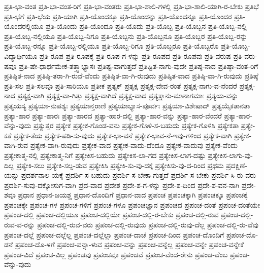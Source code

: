 {ಪ್ರತಿ-ಭಾ-ವಂತ
ಪ್ರತಿ-ಭಾ-ವಂತ-ರಿಗೆ
ಪ್ರತಿ-ಭಾ-ವಂತರು
ಪ್ರತಿ-ಭಾ-ಶಾಲಿ-ಗಳಲ್ಲಿ
ಪ್ರತಿ-ಭಾ-ಶಾಲಿ-ಯಾಗಿ-ರ-ಬೇಕು
ಪ್ರತಿಭೆ
ಪ್ರತಿ-ಭೆಗೆ
ಪ್ರತಿ-ಭೆಯ
ಪ್ರತಿ-ಯಾಗಿ
ಪ್ರತಿ-ಯೊಂದಕ್ಕೂ
ಪ್ರತಿ-ಯೊಂದನ್ನು
ಪ್ರತಿ-ಯೊಂದನ್ನೂ
ಪ್ರತಿ-ಯೊಂದರ
ಪ್ರತಿ-ಯೊಂದರಲ್ಲಿಯೂ
ಪ್ರತಿ-ಯೊಂದು
ಪ್ರತಿ-ಯೊಂದೂ
ಪ್ರತಿ-ಯೊದು
ಪ್ರತಿ-ಯೊಬ್ಬ
ಪ್ರತಿ-ಯೊಬ್ಬನ
ಪ್ರತಿ-ಯೊಬ್ಬ-ನಲ್ಲಿ
ಪ್ರತಿ-ಯೊಬ್ಬ-ನಲ್ಲಿಯೂ
ಪ್ರತಿ-ಯೊಬ್ಬ-ನಿಗೂ
ಪ್ರತಿ-ಯೊಬ್ಬನು
ಪ್ರತಿ-ಯೊಬ್ಬನೂ
ಪ್ರತಿ-ಯೊಬ್ಬರ
ಪ್ರತಿ-ಯೊಬ್ಬ-ರನ್ನು
ಪ್ರತಿ-ಯೊಬ್ಬ-ರನ್ನೂ
ಪ್ರತಿ-ಯೊಬ್ಬ-ರಲ್ಲಿಯೂ
ಪ್ರತಿ-ಯೊಬ್ಬ-ರಿಗೂ
ಪ್ರತಿ-ಯೊಬ್ಬರೂ
ಪ್ರತಿ-ಯೊಬ್ಬರೊ
ಪ್ರತಿ-ಯೊಬ್ಬ-ವಿದ್ಯಾರ್ಥಿಯೂ
ಪ್ರತಿ-ರೂಪ
ಪ್ರತಿ-ರೂಪಕ್ಕೆ
ಪ್ರತಿ-ರೂಪ-ಗ-ಳನ್ನು
ಪ್ರತಿ-ರೂಪದ
ಪ್ರತಿ-ರೂಪವು
ಪ್ರತಿ-ವರುಷ
ಪ್ರತಿ-ವರು-ಷವೂ
ಪ್ರತಿ-ಷೇ-ಧಾರ್ಥಮೇಕ-ತತ್ತ್ವಾಭ್ಯಾಸಃ
ಪ್ರತಿಷ್ಟ-ವಾಗುತ್ತದೆ
ಪ್ರತಿಷ್ಟಿತ-ನಾಗು-ವುದೇ
ಪ್ರತಿಷ್ಠ-ನಾದ
ಪ್ರತಿಷ್ಠಾ-ವಂತ-ರಿಗೆ
ಪ್ರತಿಷ್ಠಿತ-ನಾದ
ಪ್ರತಿಷ್ಠಿ-ತರಾ-ಗಿ-ರುವೆ-ವೆಂದು
ಪ್ರತಿಷ್ಠಿತ-ವಾ-ಗಿ-ರುವುದು
ಪ್ರತಿಷ್ಠಿತ-ವಾದ
ಪ್ರತಿಷ್ಠಿ-ವಾ-ಗಿ-ರುವುದು
ಪ್ರತಿಷ್ಠೆ
ಪ್ರತಿ-ಸಲ
ಪ್ರತಿ-ಸಲವೂ
ಪ್ರತಿ-ಸಾರಿಯೂ
ಪ್ರತೀಕ
ಪ್ರತ್ಯಕ್
ಪ್ರತ್ಯಕ್ಷ
ಪ್ರತ್ಯಕ್ಷ-ದೇವ-ರಂತೆ
ಪ್ರತ್ಯಕ್ಷ-ನಾಗು-ವ-ನೆಂದರೆ
ಪ್ರತ್ಯಕ್ಷ-ನಾದ
ಪ್ರತ್ಯಕ್ಷ-ವಾಗಿ
ಪ್ರತ್ಯಕ್ಷ-ವಾ-ಗಿತ್ತು
ಪ್ರತ್ಯಕ್ಷ-ವಾಗಿದೆ
ಪ್ರತ್ಯಕ್ಷ-ವಾದ
ಪ್ರತ್ಯಕ್ಷಾನು-ಮಾನಾಗಮಾಃ
ಪ್ರತ್ಯಯ-ವನ್ನು
ಪ್ರತ್ಯಯಸ್ಯ
ಪ್ರತ್ಯಯಾ-ನುಪಶ್ಯಃ
ಪ್ರತ್ಯಯಾನ್ತರಾಣಿ
ಪ್ರತ್ಯಯಾಭ್ಯಾಸ-ಪೂರ್ವಃ
ಪ್ರತ್ಯಯಾ-ವಿಶೇಷಾದ್
ಪ್ರತ್ಯಯೈಕತಾನತಾ
ಪ್ರತ್ಯಾ-ಹಾರ
ಪ್ರತ್ಯಾ-ಹಾರಃ
ಪ್ರತ್ಯಾ-ಹಾರದ
ಪ್ರತ್ಯಾ-ಹಾರ-ದಲ್ಲಿ
ಪ್ರತ್ಯಾ-ಹಾರ-ವನ್ನು
ಪ್ರತ್ಯಾ-ಹಾರ-ವೆಂದರೆ
ಪ್ರತ್ಯಾ-ಹಾರ-ವೆನ್ನು-ವುದು
ಪ್ರತ್ಯುತ್ತರ
ಪ್ರತ್ಯೇಕ
ಪ್ರತ್ಯೇಕ-ಗೊಂಡ-ವನು
ಪ್ರತ್ಯೇಕ-ಗೊಳಿ-ಸ-ಬಹುದು
ಪ್ರತ್ಯೇಕ-ಗೊಳಿಸಿ
ಪ್ರತ್ಯೇಕತಾ
ಪ್ರತ್ಯೇ-ಕತೆ
ಪ್ರತ್ಯೇಕ-ತೆಯ
ಪ್ರತ್ಯೇಕ-ಪಡಿ-ಸು-ವುದು
ಪ್ರತ್ಯೇಕ-ಭಾ-ವನೆ
ಪ್ರತ್ಯೇಕ-ಭಾವ-ನೆ-ಇವು-ಗಳಿಂದ
ಪ್ರತ್ಯೇಕ-ವಾಗಿ
ಪ್ರತ್ಯೇಕ-ವಾಗಿ-ರುವ
ಪ್ರತ್ಯೇಕ-ವಾಗಿ-ರುವುದು
ಪ್ರತ್ಯೇಕ-ವಾದ
ಪ್ರತ್ಯೇಕ-ವಾದು-ದೆಂದೂ
ಪ್ರತ್ಯೇಕ-ವಾದುವು
ಪ್ರತ್ಯೇಕ-ವೆಂದು
ಪ್ರತ್ಯೇಕಾತ್ಮ-ನಲ್ಲಿ
ಪ್ರತ್ಯೇಕಾತ್ಮ-ನಿಗೆ
ಪ್ರತ್ಯೇಕಿಸ-ಬಹುದು
ಪ್ರತ್ಯೇಕಿಸ-ಲಾ-ಗದ
ಪ್ರತ್ಯೇಕಿಸ-ಲಾಗ-ದಷ್ಟು
ಪ್ರತ್ಯೇಕಿಸ-ಲಾಗು-ವು-ದಿಲ್ಲ
ಪ್ರತ್ಯೇಕಿ-ಸಲು
ಪ್ರತ್ಯೇಕಿ-ಸಲ್ಪ-ಡುವ
ಪ್ರತ್ಯೇಕಿಸಿ
ಪ್ರತ್ಯೇಕಿ-ಸು-ವು-ದಕ್ಕೆ
ಪ್ರತ್ಯೇಕಿಸು-ವು-ದ-ರಿಂದ
ಪ್ರಥಮ
ಪ್ರದಕ್ಷಿಣೆ-ಯನ್ನು
ಪ್ರದರ್ಶನಾಲ-ಯಕ್ಕೆ
ಪ್ರದರ್ಶಿ-ಸ-ಬಹುದು
ಪ್ರದರ್ಶಿ-ಸ-ಬೇಕಾ-ಗುತ್ತದೆ
ಪ್ರದರ್ಶಿ-ಸ-ಬೇಕು
ಪ್ರದರ್ಶಿ-ಸಿ-ರು-ವರು
ಪ್ರದರ್ಶಿ-ಸುವು-ದಕ್ಕೋಸುಗ-ವಾಗಿ
ಪ್ರದ-ವಾದ
ಪ್ರದೇಶ
ಪ್ರದೇ-ಶ-ಗ-ಳನ್ನು
ಪ್ರದೇ-ಶ-ದಿಂದ
ಪ್ರದೇ-ಶ-ವನ-ನಾಗಿ
ಪ್ರದೇ-ಶವೂ
ಪ್ರಧಾನ
ಪ್ರಧಾನ-ಜಯಶ್ಚ
ಪ್ರಧಾನ-ದೊಂದಿಗೆ
ಪ್ರಧಾನ-ವಾದ
ಪ್ರಪಂಚ
ಪ್ರಪಂಚಕ್ಕಾಗಿ
ಪ್ರಪಂಚಕ್ಕೂ
ಪ್ರಪಂಚಕ್ಕೆ
ಪ್ರಪಂಚಕ್ಕೇ
ಪ್ರಪಂಚ-ಗಳ
ಪ್ರಪಂಚ-ಗಳಿಗೆ
ಪ್ರಪಂಚ-ಗಳೂ
ಪ್ರಪಂಚಜ್ಞಾನ
ಪ್ರಪಂಚದ
ಪ್ರಪಂಚ-ದಂತೆ
ಪ್ರಪಂಚ-ದಂತೆಯೇ
ಪ್ರಪಂಚ-ದಲ್ಲಿ
ಪ್ರಪಂಚ-ದಲ್ಲಿಯೂ
ಪ್ರಪಂಚ-ದಲ್ಲಿಯೇ
ಪ್ರಪಂಚ-ದಲ್ಲಿ-ರ-ಬೇಕು
ಪ್ರಪಂಚ-ದಲ್ಲಿ-ರುವ
ಪ್ರಪಂಚ-ದಲ್ಲಿ-ರುವ-ವ-ರನ್ನು
ಪ್ರಪಂಚ-ದಲ್ಲಿ-ರುವ-ವರು
ಪ್ರಪಂಚ-ದಲ್ಲಿ-ರುವುದು
ಪ್ರಪಂಚ-ದಲ್ಲಿ-ರುವು-ದೆಲ್ಲ
ಪ್ರಪಂಚ-ದಲ್ಲಿ-ರು-ವೆವು
ಪ್ರಪಂಚ-ದಲ್ಲೆ
ಪ್ರಪಂಚ-ದಲ್ಲೆಲ್ಲ
ಪ್ರಪಂಚ-ದಲ್ಲೆಲ್ಲಾ
ಪ್ರಪಂಚ-ದಾಚೆ
ಪ್ರಪಂಚ-ದಿಂದ
ಪ್ರಪಂಚ-ದೊಂದಿಗೆ
ಪ್ರಪಂಚ-ದೊ-ಡನೆ
ಪ್ರಪಂಚ-ದೊ-ಳಗೆ
ಪ್ರಪಂಚ-ವನ್ನಾ-ಳುವ
ಪ್ರಪಂಚ-ವನ್ನು
ಪ್ರಪಂಚ-ವನ್ನೆಲ್ಲ
ಪ್ರಪಂಚ-ವನ್ನೇ
ಪ್ರಪಂಚ-ವನ್ನೇಕೆ
ಪ್ರಪಂಚ-ವಿದೆ
ಪ್ರಪಂಚ-ವಿಲ್ಲ
ಪ್ರಪಂಚವು
ಪ್ರಪಂಚವೂ
ಪ್ರಪಂಚವೆ
ಪ್ರಪಂಚ-ವೆಂದ-ರೇನು
ಪ್ರಪಂಚ-ವೆಂಬ
ಪ್ರಪಂಚ-ವೆನ್ನು-ವುದು
}
